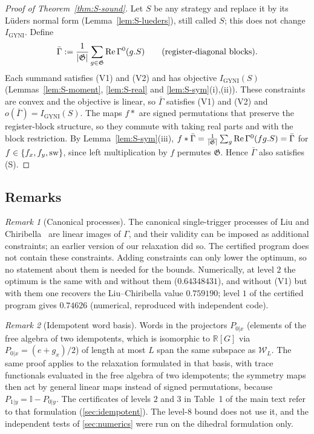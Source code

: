 \documentclass[aps,pra,onecolumn,notitlepage,superscriptaddress,longbibliography,nofootinbib,11pt]{revtex4-2}
\theoremstyle{remark}
\newtheorem{remark}{Remark}
\newcommand{\one}{\mathbb{I}}
\newcommand{\RR}{\mathbb{R}}
\newcommand{\Igy}{I_{\mathrm{GYNI}}}
\newcommand{\cW}{\mathcal{W}}
\newcommand{\GG}{\mathfrak{G}}
\begin{document}
\begin{proof}[Proof of Theorem~\ref{thm:S-sound}]
Let $S$ be any strategy and replace it by its L\"uders normal form (Lemma~\ref{lem:S-lueders}), still called $S$; this does not change $\Igy$. Define
\begin{equation}
\bar\Gamma:=\frac{1}{|\GG|}\sum_{g\in\GG}{\rm Re}\,\Gamma^0(g.S)\qquad\text{(register-diagonal blocks)}.
\end{equation}
Each summand satisfies (V1) and (V2) and has objective $\Igy(S)$ (Lemmas~\ref{lem:S-moment}, \ref{lem:S-real} and \ref{lem:S-sym}(i),(ii)). These constraints are convex and the objective is linear, so $\bar\Gamma$ satisfies (V1) and (V2) and $o(\bar\Gamma)=\Igy(S)$. The maps $f*$ are signed permutations that preserve the register-block structure, so they commute with taking real parts and with the block restriction. By Lemma~\ref{lem:S-sym}(iii), $f*\bar\Gamma=\frac{1}{|\GG|}\sum_g{\rm Re}\,\Gamma^0(fg.S)=\bar\Gamma$ for $f\in\{f_x,f_y,{\rm sw}\}$, since left multiplication by $f$ permutes $\GG$. Hence $\bar\Gamma$ also satisfies (S).
\end{proof}

\subsection{Remarks}

\begin{remark}[Canonical processes]\label{rem:canonical}
The canonical single-trigger processes of Liu and Chiribella~\cite{LiuChiribella2025} are linear images of $\Gamma$, and their validity can be imposed as additional constraints; an earlier version of our relaxation did so. The certified program does not contain these constraints. Adding constraints can only lower the optimum, so no statement about them is needed for the bounds. Numerically, at level $2$ the optimum is the same with and without them ($0.64348431$), and without (V1) but with them one recovers the Liu--Chiribella value $0.759190$; level $1$ of the certified program gives $0.74626$ (numerical, reproduced with independent code).
\end{remark}

\begin{remark}[Idempotent word basis]\label{rem:idempotent}
Words in the projectors $P_{0|x}$ (elements of the free algebra of two idempotents, which is isomorphic to $\RR[G]$ via $P_{0|x}=(e+g_x)/2$) of length at most $L$ span the same subspace as $\cW_L$. The same proof applies to the relaxation formulated in that basis, with trace functionals evaluated in the free algebra of two idempotents; the symmetry maps then act by general linear maps instead of signed permutations, because $P_{1|y}=\one-P_{0|y}$. The certificates of levels $2$ and $3$ in Table~1 of the main text refer to that formulation (\ref{sec:idempotent}). The level-8 bound does not use it, and the independent tests of \ref{sec:numerics} were run on the dihedral formulation only.
\end{remark}
\end{document}

